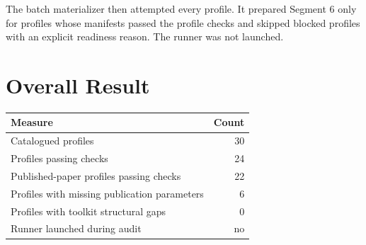 \documentclass[11pt]{article}
\begin{document}
The batch materializer then attempted every profile. It prepared Segment 6 only for profiles whose manifests passed the profile checks and skipped blocked profiles with an explicit readiness reason. The runner was not launched.

\section*{Overall Result}
\begin{center}
\begin{tabular}{lr}
\toprule
Measure & Count \\
\midrule
Catalogued profiles & 30 \\
Profiles passing checks & 24 \\
Published-paper profiles passing checks & 22 \\
Profiles with missing publication parameters & 6 \\
Profiles with toolkit structural gaps & 0 \\
Runner launched during audit & no \\
\bottomrule
\end{tabular}
\end{center}
\end{document}
